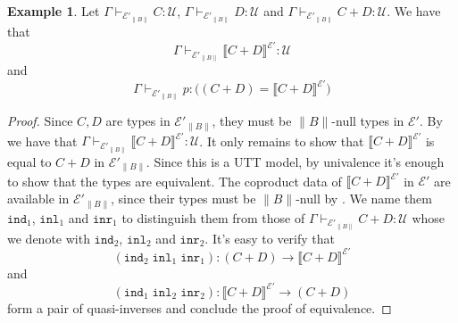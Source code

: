 \documentclass[12pt]{report}
\theoremstyle{definition}
\newtheorem{exmp}[thm]{Example}
\begin{document}
\begin{exmp}
Let $\Gamma \vdash_{\mathcal{E}'_{\lVert B \rVert}} C : \mathcal{U}$, $\Gamma \vdash_{\mathcal{E}'_{\lVert B \rVert}} D : \mathcal{U}$ and $\Gamma \vdash_{\mathcal{E}'_{\lVert B \rVert}} C +D : \mathcal{U}$. 
We have that
$$\Gamma \vdash_{\mathcal{E}'_{\lVert B \rVert}} \llbracket C + D\rrbracket^{\mathcal{E}'} : \mathcal{U}$$
and
$$\Gamma \vdash_{\mathcal{E}'_{\lVert B \rVert}} p : \big( (C +D) = \llbracket C + D\rrbracket^{\mathcal{E}'}\big)$$
\end{exmp}
\begin{proof}
Since $C, D$ are types in $\mathcal{E}'_{\lVert B \rVert}$, they must be $\lVert B \rVert$-null types in $\mathcal{E}'$. 
By  we have that $\Gamma \vdash_{\mathcal{E}'_{\lVert B \rVert}} \llbracket C + D\rrbracket^{\mathcal{E}'} : \mathcal{U}$. 
It only remains to show that $ \llbracket C + D\rrbracket^{\mathcal{E}'}$ is equal to $C+D$ in $\mathcal{E}'_{\lVert B \rVert}$. 
Since this is a UTT model, by univalence it's enough to show that the types are equivalent. 
The coproduct data of $ \llbracket C + D\rrbracket^{\mathcal{E}'}$ in $\mathcal{E}'$ are available in $\mathcal{E}'_{\lVert B \rVert}$, since their types must be $\lVert B \rVert$-null by . 
We name them $\mathtt{ind}_1$, $\mathtt{inl}_1$ and $\mathtt{inr}_1$ to distinguish them from those of $\Gamma \vdash_{\mathcal{E}'_{\lVert B \rVert}} C +D : \mathcal{U}$ whose we denote with $\mathtt{ind}_2$, $\mathtt{inl}_2$ and $\mathtt{inr}_2$. 
It's easy to verify that 
$$(\mathtt{ind}_2\;\mathtt{inl}_1\;\mathtt{inr}_1) : (C+D) \rightarrow \llbracket C + D\rrbracket^{\mathcal{E}'}$$
and
$$(\mathtt{ind}_1\;\mathtt{inl}_2\;\mathtt{inr}_2) : \llbracket C + D\rrbracket^{\mathcal{E}'} \rightarrow (C+D)$$
form a pair of quasi-inverses and conclude the proof of equivalence. 
\end{proof}
\end{document}
